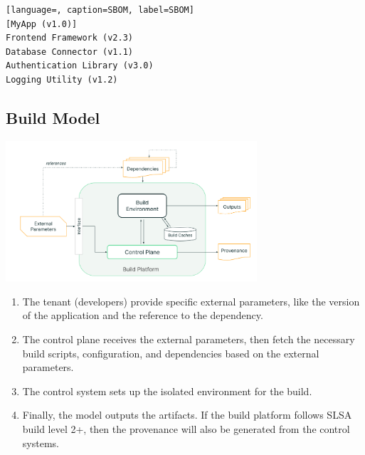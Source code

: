 \begin{lstlisting}[language=, caption=SBOM, label=SBOM]
[MyApp (v1.0)]
Frontend Framework (v2.3)
Database Connector (v1.1)
Authentication Library (v3.0)
Logging Utility (v1.2)
\end{lstlisting}

\subsection{Build Model}
\includegraphics[width=0.7\textwidth]{./screenshot/build_model.png}
\begin{enumerate}
  \item The tenant (developers) provide specific external parameters, like the version of the application 
  and the reference to the dependency.
  \item The control plane receives the external parameters, then fetch the necessary build scripts, configuration,  
  and dependencies based on the external parameters.
  \item The control system sets up the isolated environment for the build.
  \item Finally, the model outputs the artifacts. If the build platform follows SLSA build level 2+, then
  the provenance will also be generated from the control systems.
\end{enumerate}
